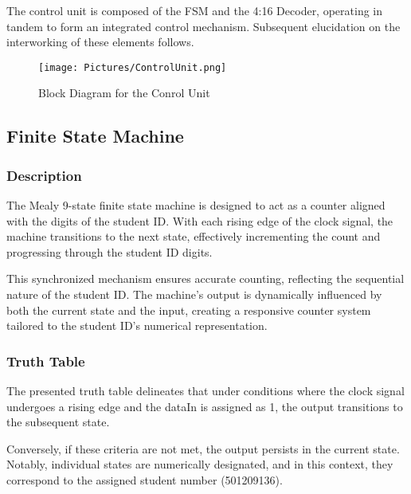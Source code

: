 
	{The control unit is composed of the FSM and the 4:16 Decoder, operating in tandem to form an integrated control mechanism. Subsequent elucidation on the interworking of these elements follows.}

	\begin{figure}[H]
		\centering
		\texttt{[image: Pictures/ControlUnit.png]}
		\caption{{Block Diagram for the Conrol Unit}}
		\label{}
	\end{figure}

\subsection{{Finite State Machine}}

	\subsubsection{{Description}}
	
		{The Mealy 9-state finite state machine is designed to act as a counter aligned with the digits of the student ID. With each rising edge of the clock signal, the machine transitions to the next state, effectively incrementing the count and progressing through the student ID digits.}
			
		{This synchronized mechanism ensures accurate counting, reflecting the sequential nature of the student ID. The machine's output is dynamically influenced by both the current state and the input, creating a responsive counter system tailored to the student ID's numerical representation.}
	
	\subsubsection{{Truth Table}}
	
		{The presented truth table delineates that under conditions where the clock signal undergoes a rising edge and the dataIn is assigned as 1, the output transitions to the subsequent state.}
		
		{Conversely, if these criteria are not met, the output persists in the current state. Notably, individual states are numerically designated, and in this context, they correspond to the assigned student number (501209136).}

